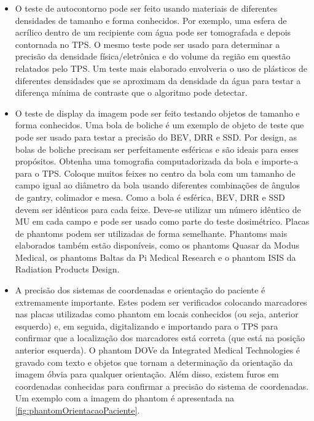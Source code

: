 \documentclass[11pt,a4paper]{article}
\newcounter{exemplo}
\begin{document}
	\begin{itemize}[label=\textcolor{CarnationPink}{$\star$}]
		\item O teste de autocontorno pode ser feito usando materiais de diferentes densidades de tamanho e forma conhecidos. Por exemplo, uma esfera de acrílico dentro de um recipiente com água pode ser tomografada e depois contornada no TPS. O mesmo teste pode ser usado para determinar a precisão da densidade física/eletrônica e do volume da região em questão relatados pelo TPS. Um teste mais elaborado envolveria o uso de plásticos de diferentes densidades que se aproximam da densidade da água para testar a diferença mínima de contraste que o algoritmo pode detectar.
		
		\item O teste de display da imagem pode ser feito testando objetos de tamanho e forma conhecidos. Uma bola de boliche é um exemplo de objeto de teste que pode ser usado para testar a precisão do BEV, DRR e SSD. Por design, as bolas de boliche precisam ser perfeitamente esféricas e são ideais para esses propósitos. Obtenha uma tomografia computadorizada da bola e importe-a para o TPS. Coloque muitos feixes no centro da bola com um tamanho de campo igual ao diâmetro da bola usando diferentes combinações de ângulos de gantry, colimador e mesa. Como a bola é esférica, BEV, DRR e SSD devem ser idênticos para cada feixe. Deve-se utilizar um número idêntico de MU em cada campo e pode ser usado como parte do teste dosimétrico. Placas de phantoms podem ser utilizadas de forma semelhante. Phantoms mais elaborados também estão disponíveis, como os phantoms Quasar da Modus Medical, os phantoms Baltas da Pi Medical Research e o phantom ISIS da Radiation Products Design.
		
		\item A precisão dos sistemas de coordenadas e orientação do paciente é extremamente importante. Estes podem ser verificados colocando marcadores nas placas utilizadas como phantom em locais conhecidos (ou seja, anterior esquerdo) e, em seguida, digitalizando e importando para o TPS para confirmar que a localização dos marcadores está correta (que está na posição anterior esquerda). O phantom DOVe da Integrated Medical Technologies é gravado com texto e objetos que tornam a determinação da orientação da imagem óbvia para qualquer orientação. Além disso, existem furos em coordenadas conhecidas para confirmar a precisão do sistema de coordenadas. Um exemplo com a imagem do phantom é apresentada na \ref{fig:phantomOrientacaoPaciente}.
		

\end{itemize}
\end{document}
